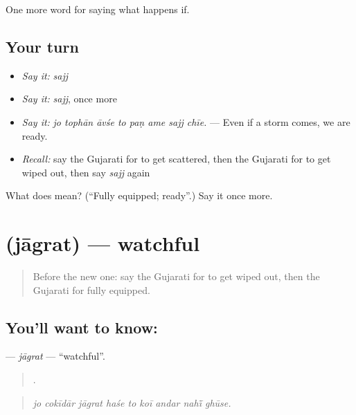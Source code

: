 \begin{grammarlens}[title={What you've built}]
One more word for saying what happens if.
\end{grammarlens}

\subsection*{Your turn}
\begin{itemize}
\raggedright
  \item \emph{Say it:} \emph{sajj}
  \item \emph{Say it:} \emph{sajj}, once more
  \item \emph{Say it:} \emph{jo tophān āvśe to paṇ ame sajj chīe.} — Even if a storm comes, we are ready.
  \item \emph{Recall:} say the Gujarati for to get scattered, then the Gujarati for to get wiped out, then say \emph{sajj} again
\end{itemize}

\begin{tcolorbox}[breakable,colback=teal!4,colframe=teal!35!black,title={Before you move on}]
What does  mean? (\textquotedblleft{}Fully equipped; ready\textquotedblright{}.) Say it once more.
\end{tcolorbox}
\section[\texorpdfstring{\gu{જાગ્રત} (jāgrat)}{જાગ્રત (jāgrat)}]{ (jāgrat) — watchful}

\label{lesson:GU-C392-jagrat}



\begin{quote}
Before the new one: say the Gujarati for to get wiped out, then the Gujarati for fully equipped.
\end{quote}

\subsection*{You'll want to know: }
\textbf{} — \emph{jāgrat} — \textquotedblleft{}watchful\textquotedblright{}.

\begin{quote}
        .
\end{quote}

\begin{quote}
\emph{jo cokīdār jāgrat haśe to koī andar nahī̃ ghūse.}
\end{quote}

